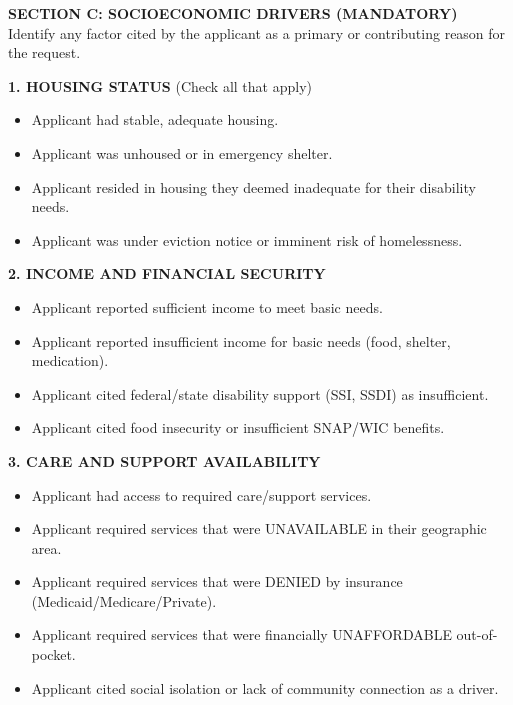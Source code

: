 \documentclass[10pt]{article}
\begin{document}
\vspace{1em}
\noindent\textbf{\large SECTION C: SOCIOECONOMIC DRIVERS (MANDATORY)}\\[0.2em]
Identify any factor cited by the applicant as a primary or contributing reason for the request.

\vspace{0.5em}
\noindent\textbf{1. HOUSING STATUS} (Check all that apply)
\begin{itemize}
    \item[$\square$] Applicant had stable, adequate housing.
    \item[$\square$] Applicant was unhoused or in emergency shelter.
    \item[$\square$] Applicant resided in housing they deemed inadequate for their disability needs.
    \item[$\square$] Applicant was under eviction notice or imminent risk of homelessness.
\end{itemize}

\noindent\textbf{2. INCOME AND FINANCIAL SECURITY}
\begin{itemize}
    \item[$\square$] Applicant reported sufficient income to meet basic needs.
    \item[$\square$] Applicant reported insufficient income for basic needs (food, shelter, medication).
    \item[$\square$] Applicant cited federal/state disability support (SSI, SSDI) as insufficient.
    \item[$\square$] Applicant cited food insecurity or insufficient SNAP/WIC benefits.
\end{itemize}

\noindent\textbf{3. CARE AND SUPPORT AVAILABILITY}
\begin{itemize}
    \item[$\square$] Applicant had access to required care/support services.
    \item[$\square$] Applicant required services that were UNAVAILABLE in their geographic area.
    \item[$\square$] Applicant required services that were DENIED by insurance (Medicaid/Medicare/Private).
    \item[$\square$] Applicant required services that were financially UNAFFORDABLE out-of-pocket.
    \item[$\square$] Applicant cited social isolation or lack of community connection as a driver.
\end{itemize}
\end{document}
